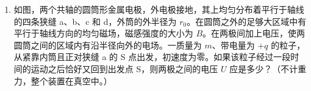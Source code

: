 \documentclass[\gkver]{gaokaozhenti}
\begin{document}
\begin{enumerate}
{式中 $G$ 为万有引力恒量。因同步卫星绕地心转动的角速度 $\omega$ 与地球自转的角速度相等，有

$\omega=\frac{2\pi}{T}$ ②

因 $G\frac{Mm}{R^{2}}=mg$，得

$GM=gR^{2}$ ③

设嘉峪关到同步卫星的距离为 $L$，如图所示，由余弦定理

$L=\sqrt{r^{2}+R^{2}-2rR\cos\alpha}$ ④

所求时间为

$t=\frac{L}{c}$ ⑤

由以上各式得

$t=\frac{\sqrt{\left(\frac{R^{2}gT^{2}}{4\pi^{2}}\right)^{\frac{2}{3}}+R^{2}-2R\left(\frac{R^{2}gT^{2}}{4\pi^{2}}\right)^{\frac{1}{3}}\cos\alpha}}{c}$ ⑥


评分标准：本题 12 分，①式 1 分，②式 2 分，③式 1 分，④式 5 分，⑤式 1 分，⑥式 2 分。
}

\item
如图，两个共轴的圆筒形金属电极，外电极接地，其上均匀分布着平行于轴线的四条狭缝 a、b、c 和 d，外筒的外半径为 $r_{0}$。在圆筒之外的足够大区域中有平行于轴线方向的均匀磁场，磁感强度的大小为 $B$。在两极间加上电压，使两圆筒之间的区域内有沿半径向外的电场。一质量为 $m$、带电量为 $+q$ 的粒子，从紧靠内筒且正对狭缝 a 的 S 点出发，初速度为零。如果该粒子经过一段时间的运动之后恰好又回到出发点 S，则两极之间的电压 $U$ 应是多少？（不计重力，整个装置在真空中。）


\end{enumerate}
\end{document}
